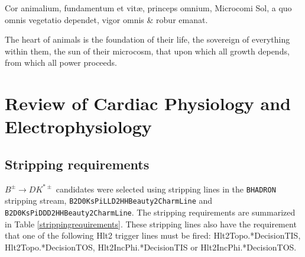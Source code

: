
\clearpage
\begin{savequote}[8cm]
\textlatin{Cor animalium, fundamentum e\longs t vitæ, princeps omnium, Microco\longs mi Sol, a quo omnis vegetatio dependet, vigor omnis \& robur emanat.}

The heart of animals is the foundation of their life, the sovereign of everything within them, the sun of their microcosm, that upon which all growth depends, from which all power proceeds.
\end{savequote}

\chapter{\label{app:1-cardiophys}Review of Cardiac Physiology and Electrophysiology}

\minitoc
\section{Stripping requirements}
\label{sec:app:stripping}

$B^{\pm} \to DK^{*\pm}$ candidates were selected using stripping lines in the {\tt BHADRON} stripping stream, {\tt B2D0KsPiLLD2HHBeauty2CharmLine} and {\tt B2D0KsPiDDD2HHBeauty2CharmLine}. The stripping requirements are summarized in Table \ref{strippingrequirements}. These stripping lines also have the requirement that one of the following Hlt2 trigger lines must be fired: Hlt2Topo.*DecisionTIS, Hlt2Topo.*DecisionTOS, Hlt2IncPhi.*DecisionTIS or Hlt2IncPhi.*DecisionTOS.


